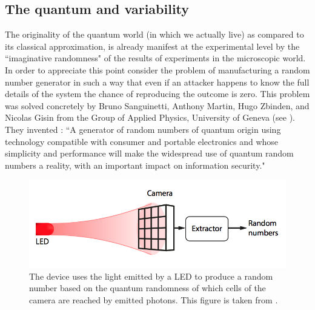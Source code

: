 \documentclass[12pt]{article}
\begin{document}

\subsection{The quantum and variability}\label{sect qvariables}

The originality of the quantum world (in which we actually live) as compared to its classical approximation, is already manifest at the experimental level by the ``imaginative 
randomness" of the results of experiments in the microscopic world. In order to appreciate this point consider the problem of manufacturing  a random number generator in such a way that even if an attacker happens to know the full details of the system the chance of reproducing the outcome is zero. This problem was solved concretely by  Bruno Sanguinetti, Anthony Martin, Hugo Zbinden, and Nicolas Gisin from the Group of Applied Physics, University of Geneva (see \cite{SMZG}). They invented : ``A generator of random numbers of quantum origin using technology compatible with consumer and portable electronics and whose  simplicity and performance  will make the widespread use of quantum random numbers a reality, with an important impact on information security."

\begin{figure}[H]
\begin{center}
\includegraphics[scale=1]{qnumber1.png}
\end{center}
\caption{The device uses the light emitted by a LED to produce a random number based on the quantum randomness of which cells of the camera are reached by emitted photons.  This figure is taken from \cite{SMZG}.\label{randomness} }
\end{figure}
\end{document}
